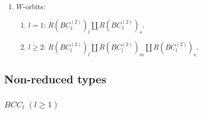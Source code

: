 \documentclass[11pt]{amsart}
\begin{document}
{\begin{enumerate}
\begin{enumerate}
\begin{center}
\end{center}
\end{enumerate}
\item $W$-orbits:
\begin{enumerate}
\item[i)] $l=1$: $R(BC_1^{(2)})_l \amalg R(BC_1^{(2)})_s$.
\item[ii)] $l\geq 2$: $R(BC_l^{(2)})_l \amalg R(BC_l^{(2)})_m \amalg R(BC_l^{(2)})_s$.
\end{enumerate}
\end{enumerate}



\subsection{Non-reduced types}\label{sect_non-red-affine}

\subsubsection{$BCC_l\; (l\geq 1)$}\label{sect_data-BCC}

}
\end{document}
